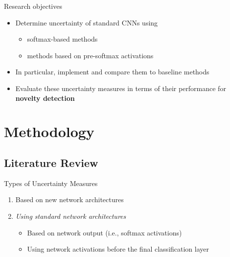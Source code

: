 \documentclass{beamer}
\begin{document}
\begin{frame}{Research objectives}
	\begin{itemize}
		\item Determine uncertainty of standard \glspl{CNN} using
		\begin{itemize}
			\item softmax-based methods
			\item methods based on pre-softmax activations
		\end{itemize}
		\item In particular, implement  and compare them to baseline methods
		\item Evaluate these uncertainty measures in terms of their performance for \textbf{novelty detection}
	\end{itemize}
\end{frame}

\section{Methodology}
\subsection{Literature Review}

\begin{frame}{Types of Uncertainty Measures}
	\begin{enumerate}
	\item Based on new network architectures
	\item \textit{Using standard network architectures}
	\begin{itemize}
		\item Based on network output (i.e., softmax activations)
		\item Using network activations before the final classification layer
	\end{itemize}
	\end{enumerate}
\end{frame}
\end{document}
